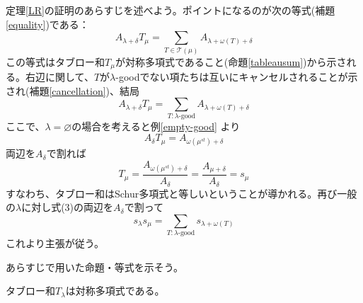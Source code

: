 \documentclass{ltjsarticle}
\begin{document}
定理\ref{LR}の証明のあらすじを述べよう。ポイントになるのが次の等式(補題\ref{equality})である：
\[
A_{\lambda+\delta}T_\mu=\sum_{T\in\mathcal{T}(\mu)}A_{\lambda+\omega(T)+\delta} 
\]
この等式はタブロー和$T_\mu$が対称多項式であること(命題\ref{tableausum})から示される。右辺に関して、$T$が$\lambda$-goodでない項たちは互いにキャンセルされることが示され(補題\ref{cancellation})、結局
\begin{equation}
A_{\lambda+\delta}T_\mu=\sum_{T:\lambda\text{-good}}A_{\lambda+\omega(T)+\delta}   
\end{equation}
ここで、$\lambda=\varnothing$の場合を考えると例\ref{empty-good}
より
\[
A_{\delta}T_\mu=A_{\omega({\mu^{st}})+\delta}
\]
両辺を$A_\delta$で割れば
\[
T_\mu=\frac{A_{\omega(\mu^{st})+\delta}}{A_\delta}=\frac{A_{\mu+\delta}}{A_\delta}=s_\mu
\]
すなわち、タブロー和はSchur多項式と等しいということが導かれる。再び一般の$\lambda$に対し式(3)の両辺を$A_\delta$で割って
\[
s_\lambda s_\mu=\sum_{T:\lambda\text{-good}}s_{\lambda+\omega(T)}
\]
これより主張が従う。

あらすじで用いた命題・等式を示そう。

\begin{prop}\label{tableausum}
    タブロー和$T_\lambda$は対称多項式である。
\end{prop}
\end{document}
